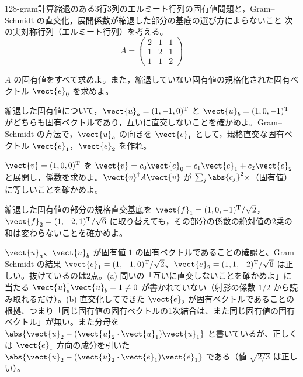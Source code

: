 \documentclass[uplatex,dvipdfmx,a4paper,11pt]{jsarticle}
\begin{document}
\begin{mondai}{128-gram}{計算}{縮退のある3行3列のエルミート行列の固有値問題と，Gram--Schmidt の直交化，展開係数が縮退した部分の基底の選び方によらないこと}
次の実対称行列（エルミート行列）を考える。
  \[ A=\begin{pmatrix} 2 & 1 & 1\\ 1 & 2 & 1\\ 1 & 1 & 2 \end{pmatrix} \]
  \begin{shoumon}
    \item $A$ の固有値をすべて求めよ。また，縮退していない固有値の規格化された固有ベクトル $\vect{e}_{0}$ を求めよ。
    \item 縮退した固有値について，$\vect{u}_{a}=(1,-1,0)^{\mathrm{T}}$ と $\vect{u}_{b}=(1,0,-1)^{\mathrm{T}}$ がどちらも固有ベクトルであり，互いに直交しないことを確かめよ。Gram--Schmidt の方法で，$\vect{u}_{a}$ の向きを $\vect{e}_{1}$ として，規格直交な固有ベクトル $\vect{e}_{1}$，$\vect{e}_{2}$ を作れ。
    \item $\vect{v}=(1,0,0)^{\mathrm{T}}$ を $\vect{v}=c_{0}\vect{e}_{0}+c_{1}\vect{e}_{1}+c_{2}\vect{e}_{2}$ と展開し，係数を求めよ。$\vect{v}^{\dagger}A\vect{v}$ が $\sum_{j}\abs{c_{j}}^{2}\times$（固有値）に等しいことを確かめよ。
    \item 縮退した固有値の部分の規格直交基底を $\vect{f}_{1}=(1,0,-1)^{\mathrm{T}}/\sqrt{2}$，$\vect{f}_{2}=(1,-2,1)^{\mathrm{T}}/\sqrt{6}$ に取り替えても，その部分の係数の絶対値の2乗の和は変わらないことを確かめよ。
  \end{shoumon}

\begin{kotaeran}
   $\vect{u}_{a}$、$\vect{u}_{b}$ が固有値 $1$ の固有ベクトルであることの確認と、Gram--Schmidt の結果 $\vect{e}_{1}=(1,-1,0)^{\mathrm{T}}/\sqrt{2}$、$\vect{e}_{2}=(1,1,-2)^{\mathrm{T}}/\sqrt{6}$ は正しい。抜けているのは2点。(a) 問いの「互いに直交しないことを確かめよ」に当たる $\vect{u}_{a}^{\dagger}\vect{u}_{b}=1\neq0$ が書かれていない（射影の係数 $1/2$ から読み取れるだけ）。(b) 直交化してできた $\vect{e}_{2}$ が固有ベクトルであることの根拠、つまり「同じ固有値の固有ベクトルの1次結合は、また同じ固有値の固有ベクトル」が無い。また分母を $\abs{\vect{u}_{2}-(\vect{u}_{2}\cdot\vect{u}_{1})\vect{u}_{1}}$ と書いているが、正しくは $\vect{e}_{1}$ 方向の成分を引いた $\abs{\vect{u}_{2}-(\vect{u}_{2}\cdot\vect{e}_{1})\vect{e}_{1}}$ である（値 $\sqrt{2/3}$ は正しい）。


\end{kotaeran}
\end{mondai}
\end{document}
